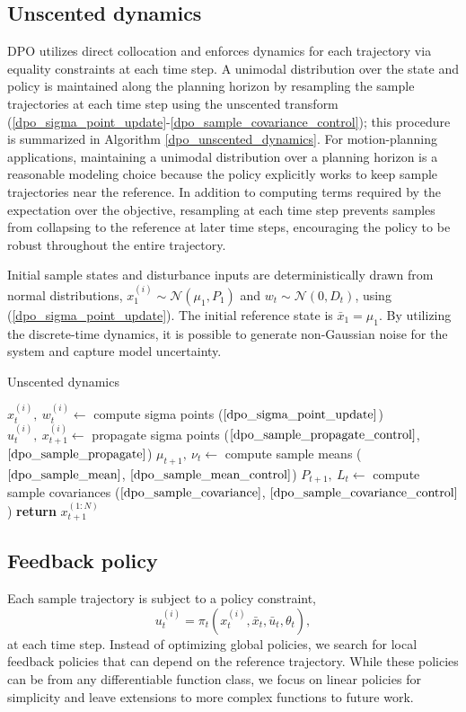 \subsection{Unscented dynamics}
DPO utilizes direct collocation and enforces dynamics for each trajectory via equality constraints at each time step. A unimodal distribution over the state and policy is maintained along the planning horizon by resampling the sample trajectories at each time step using the unscented transform (\ref{dpo_sigma_point_update}-\ref{dpo_sample_covariance_control}); this procedure is summarized in Algorithm \ref{dpo_unscented_dynamics}. For motion-planning applications, maintaining a unimodal distribution over a planning horizon is a reasonable modeling choice because the policy explicitly works to keep sample trajectories near the reference. In addition to computing terms required by the expectation over the objective, resampling at each time step prevents samples from collapsing to the reference at later time steps, encouraging the policy to be robust throughout the entire trajectory.

Initial sample states and disturbance inputs are deterministically drawn from normal distributions, $x_1^{(i)} \sim \mathcal{N}(\mu_1, P_1)$ and $w_t \sim \mathcal{N}(0, D_t)$, using (\ref{dpo_sigma_point_update}). The initial reference state is $\bar{x}_1 = \mu_1$. By utilizing the discrete-time dynamics, it is possible to generate non-Gaussian noise for the system and capture model uncertainty.

\begin{algorithm}[H]
	\caption[Unscented dynamics]{Unscented dynamics}\label{dpo_unscented_dynamics}
	\begin{algorithmic}[1]
		\State $x_{t}^{(i)},~w_t^{(i)} \leftarrow$ compute sigma points ($\ref{dpo_sigma_point_update}$)
		\State $u^{(i)}_t,~x^{(i)}_{t+1} \leftarrow$ propagate sigma points ($\ref{dpo_sample_propagate_control}$, $\ref{dpo_sample_propagate}$)
		\EndFor
		\State $\mu_{t+1},~\nu_t \leftarrow$ compute sample means ($\ref{dpo_sample_mean}$, $\ref{dpo_sample_mean_control}$)
		\State $P_{t+1},~L_t \leftarrow$ compute sample covariances ($\ref{dpo_sample_covariance}$, $\ref{dpo_sample_covariance_control}$)
		\State \textbf{return} $x_{t+1}^{(1:N)}$
		\EndFunction
	\end{algorithmic}
\end{algorithm}	

\subsection{Feedback policy}
Each sample trajectory is subject to a policy constraint,
\begin{equation}
	u_t^{(i)} = \pi_t(x_t^{(i)},\bar{x}_t,\bar{u}_t,\theta_t), \label{dpo_policy_constraint}
\end{equation}
at each time step. Instead of optimizing global policies, we search for local feedback policies that can depend on the reference trajectory. While these policies can be from any differentiable function class, we focus on linear policies for simplicity and leave extensions to more complex functions to future work.

